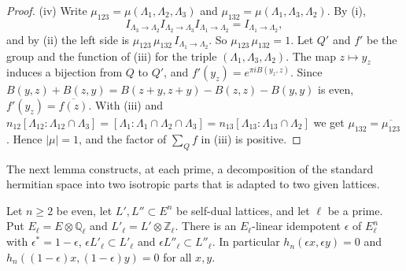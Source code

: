 \begin{proof}
(iv) Write $\mu_{123}=\mu(\Lambda_1,\Lambda_2,\Lambda_3)$ and $\mu_{132}=\mu(\Lambda_1,\Lambda_3,\Lambda_2)$. By (i),
\[
I_{\Lambda_3\to\Lambda_2}I_{\Lambda_2\to\Lambda_3}I_{\Lambda_1\to\Lambda_2}=I_{\Lambda_1\to\Lambda_2},
\]
and by (ii) the left side is $\mu_{123}\,\mu_{132}\,I_{\Lambda_1\to\Lambda_2}$. So $\mu_{123}\,\mu_{132}=1$. Let $Q'$ and $f'$ be the group and the function of (iii) for the triple $(\Lambda_1,\Lambda_3,\Lambda_2)$. The map $z\mapsto y_z$ induces a bijection from $Q$ to $Q'$, and $f'(y_z)=e^{\pi iB(y_z,z)}$. Since $B(y,z)+B(z,y)=B(z+y,z+y)-B(z,z)-B(y,y)$ is even, $f'(y_z)=\overline{f(z)}$. With (iii) and $n_{12}[\Lambda_{12}:\Lambda_{12}\cap\Lambda_3]=[\Lambda_1:\Lambda_1\cap\Lambda_2\cap\Lambda_3]=n_{13}[\Lambda_{13}:\Lambda_{13}\cap\Lambda_2]$ we get $\mu_{132}=\overline{\mu_{123}}$. Hence $\lvert\mu\rvert=1$, and the factor of $\sum_Qf$ in (iii) is positive.
\end{proof}

The next lemma constructs, at each prime, a decomposition of the standard hermitian space into two isotropic parts that is adapted to two given lattices.

\begin{lemma}\label{hypidem}
Let $n\ge2$ be even, let $L',L''\subset E^n$ be self-dual lattices, and let $\ell$ be a prime. Put $E_\ell=E\otimes\mathbb Q_\ell$ and $L'_\ell=L'\otimes\mathbb Z_\ell$. There is an $E_\ell$-linear idempotent $\epsilon$ of $E_\ell^n$ with $\epsilon^\ast=1-\epsilon$, $\epsilon L'_\ell\subset L'_\ell$ and $\epsilon L''_\ell\subset L''_\ell$. In particular $h_n(\epsilon x,\epsilon y)=0$ and $h_n((1-\epsilon)x,(1-\epsilon)y)=0$ for all $x,y$.
\end{lemma}

